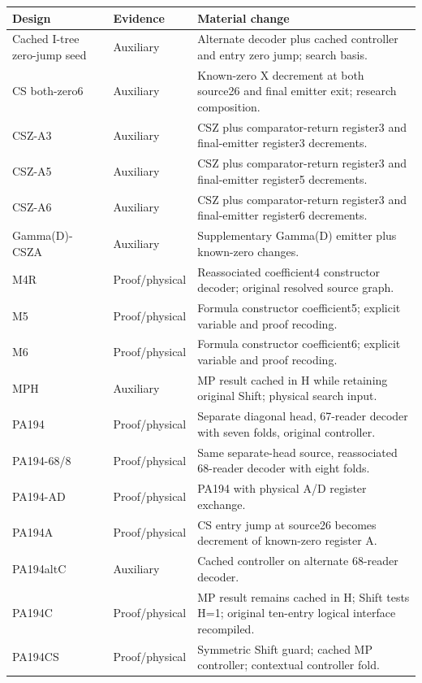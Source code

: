 {\small
\begin{longtable}{p{}p{}p{}}
\toprule Design & Evidence & Material change\\\midrule\endhead
Cached I-tree zero-jump seed & Auxiliary & Alternate decoder plus cached controller and entry zero jump; search basis.\\[5pt]
CS both-zero6 & Auxiliary & Known-zero X decrement at both source26 and final emitter exit; research composition.\\[5pt]
CSZ-A3 & Auxiliary & CSZ plus comparator-return register3 and final-emitter register3 decrements.\\[5pt]
CSZ-A5 & Auxiliary & CSZ plus comparator-return register3 and final-emitter register5 decrements.\\[5pt]
CSZ-A6 & Auxiliary & CSZ plus comparator-return register3 and final-emitter register6 decrements.\\[5pt]
Gamma(D)-CSZA & Auxiliary & Supplementary Gamma(D) emitter plus known-zero changes.\\[5pt]
M4R & Proof/physical & Reassociated coefficient4 constructor decoder; original resolved source graph.\\[5pt]
M5 & Proof/physical & Formula constructor coefficient5; explicit variable and proof recoding.\\[5pt]
M6 & Proof/physical & Formula constructor coefficient6; explicit variable and proof recoding.\\[5pt]
MPH & Auxiliary & MP result cached in H while retaining original Shift; physical search input.\\[5pt]
PA194 & Proof/physical & Separate diagonal head, 67-reader decoder with seven folds, original controller.\\[5pt]
PA194-68/8 & Proof/physical & Same separate-head source, reassociated 68-reader decoder with eight folds.\\[5pt]
PA194-AD & Proof/physical & PA194 with physical A/D register exchange.\\[5pt]
PA194A & Proof/physical & CS entry jump at source26 becomes decrement of known-zero register A.\\[5pt]
PA194altC & Auxiliary & Cached controller on alternate 68-reader decoder.\\[5pt]
PA194C & Proof/physical & MP result remains cached in H; Shift tests H=1; original ten-entry logical interface recompiled.\\[5pt]
PA194CS & Proof/physical & Symmetric Shift guard; cached MP controller; contextual controller fold.\\[5pt]

\end{longtable}}

